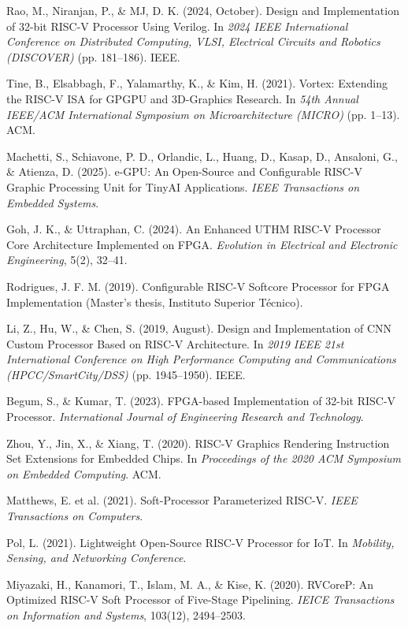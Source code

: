 \documentclass[conference]{IEEEtran}
\begin{document}
\begin{thebibliography}{00}

 Rao, M., Niranjan, P., \& MJ, D. K. (2024, October). Design and Implementation of 32-bit RISC-V Processor Using Verilog. In \textit{2024 IEEE International Conference on Distributed Computing, VLSI, Electrical Circuits and Robotics (DISCOVER)} (pp. 181–186). IEEE.

 Tine, B., Elsabbagh, F., Yalamarthy, K., \& Kim, H. (2021). Vortex: Extending the RISC-V ISA for GPGPU and 3D-Graphics Research. In \textit{54th Annual IEEE/ACM International Symposium on Microarchitecture (MICRO)} (pp. 1–13). ACM.

 Machetti, S., Schiavone, P. D., Orlandic, L., Huang, D., Kasap, D., Ansaloni, G., \& Atienza, D. (2025). e-GPU: An Open-Source and Configurable RISC-V Graphic Processing Unit for TinyAI Applications. \textit{IEEE Transactions on Embedded Systems}.

 Goh, J. K., \& Uttraphan, C. (2024). An Enhanced UTHM RISC-V Processor Core Architecture Implemented on FPGA. \textit{Evolution in Electrical and Electronic Engineering}, 5(2), 32–41.

 Rodrigues, J. F. M. (2019). Configurable RISC-V Softcore Processor for FPGA Implementation (Master’s thesis, Instituto Superior Técnico).

 Li, Z., Hu, W., \& Chen, S. (2019, August). Design and Implementation of CNN Custom Processor Based on RISC-V Architecture. In \textit{2019 IEEE 21st International Conference on High Performance Computing and Communications (HPCC/SmartCity/DSS)} (pp. 1945–1950). IEEE.

 Begum, S., \& Kumar, T. (2023). FPGA-based Implementation of 32-bit RISC-V Processor. \textit{International Journal of Engineering Research and Technology}.

 Zhou, Y., Jin, X., \& Xiang, T. (2020). RISC-V Graphics Rendering Instruction Set Extensions for Embedded Chips. In \textit{Proceedings of the 2020 ACM Symposium on Embedded Computing}. ACM.

 Matthews, E. et al. (2021). Soft-Processor Parameterized RISC-V. \textit{IEEE Transactions on Computers}.

 Pol, L. (2021). Lightweight Open-Source RISC-V Processor for IoT. In \textit{Mobility, Sensing, and Networking Conference}.

 Miyazaki, H., Kanamori, T., Islam, M. A., \& Kise, K. (2020). RVCoreP: An Optimized RISC-V Soft Processor of Five-Stage Pipelining. \textit{IEICE Transactions on Information and Systems}, 103(12), 2494–2503.


\end{thebibliography}
\end{document}
